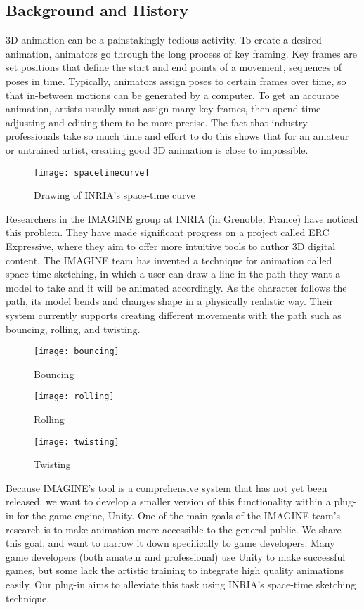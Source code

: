 \subsection{Background and History}
3D animation can be a painstakingly tedious activity. To create a desired animation, animators go through the long process of key framing. Key frames are set positions that define the start and end points of a movement, sequences of poses in time. Typically, animators assign poses to certain frames over time, so that in-between motions can be generated by a computer. To get an accurate animation, artists usually must assign many key frames, then spend time adjusting and editing them to be more precise. The fact that industry professionals take so much time and effort to do this shows that for an amateur or untrained artist, creating good 3D animation is close to impossible.

\begin{figure}[H]
\centering
\texttt{[image: spacetimecurve]}
\caption{Drawing of INRIA's space-time curve}
\label{fig:spaceTimeCurve}
\end{figure}

Researchers in the IMAGINE group at INRIA (in Grenoble, France) have noticed this problem. They have made significant progress on a project called ERC Expressive, where they aim to offer more intuitive tools to author 3D digital content. The IMAGINE team has invented a technique for animation called space-time sketching, in which a user can draw a line in the path they want a model to take and it will be animated accordingly. As the character follows the path, its model bends and changes shape in a physically realistic way. Their system currently supports creating different movements with the path such as bouncing, rolling, and twisting.

\begin{figure}[!htb]
  \texttt{[image: bouncing]}
  \caption{Bouncing}\label{fig:bouncing}
\endminipage\hfill
{}
  \texttt{[image: rolling]}
  \caption{Rolling}\label{fig:rolling}
\endminipage\hfill
{}%
  \texttt{[image: twisting]}
  \caption{Twisting}\label{fig:twisting}
\endminipage
\end{figure}

Because IMAGINE's tool is a comprehensive system that has not yet been released, we want to develop a smaller version of this functionality within a plug-in for the game engine, Unity. One of the main goals of the IMAGINE team's research is to make animation more accessible to the general public. We share this goal, and want to narrow it down specifically to game developers. Many game developers (both amateur and professional) use Unity to make successful games, but some lack the artistic training to integrate high quality animations easily. Our plug-in aims to alleviate this task using INRIA's space-time sketching technique. 

